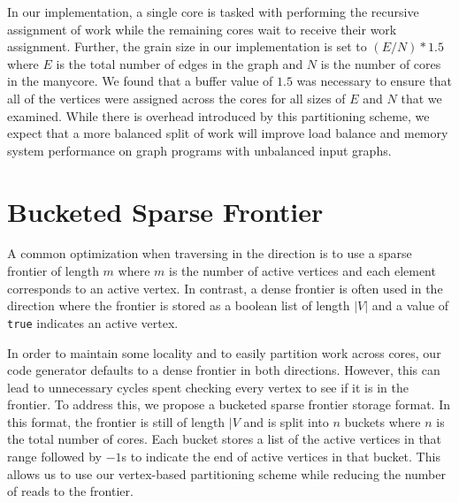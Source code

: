 In our implementation, a single core is tasked with performing the recursive assignment of work while the remaining cores wait to receive their work assignment. 
Further, the grain size in our implementation is set to $(E / N) * 1.5$ where $E$ is the total number of edges in the graph and $N$ is the number of cores in the manycore. 
We found that a buffer value of $1.5$ was necessary to ensure that all of the vertices were assigned across the cores for all sizes of $E$ and $N$ that we examined.
While there is overhead introduced by this partitioning scheme, we expect that a more balanced split of work will improve load balance and memory system performance on graph programs with unbalanced input graphs.




\section{Bucketed Sparse Frontier}
A common optimization when traversing in the \push direction is to use a sparse frontier of length $m$ where $m$ is the number of active vertices and each element corresponds to an active vertex.
In contrast, a dense frontier is often used in the \pull direction where the frontier is stored as a boolean list of length $|V|$ and a value of \lstinline{true} indicates an active vertex.

In order to maintain some locality and to easily partition work across cores, our code generator defaults to a dense frontier in both directions.
However, this can lead to unnecessary cycles spent checking every vertex to see if it is in the frontier.
To address this, we propose a bucketed sparse frontier storage format. 
In this format, the frontier is still of length $|V$ and is split into $n$ buckets where $n$ is the total number of cores.
Each bucket stores a list of the active vertices in that range followed by $-1$s to indicate the end of active vertices in that bucket.
This allows us to use our vertex-based partitioning scheme while reducing the number of reads to the frontier.

